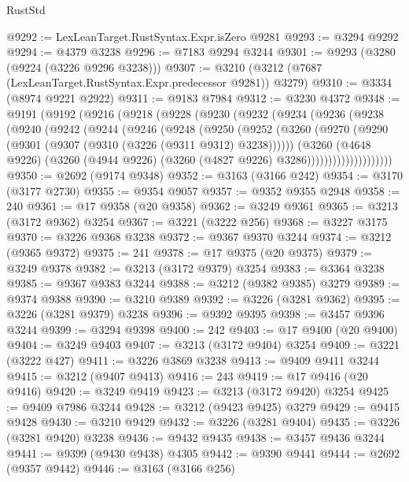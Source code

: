 \begin{lexlean}{RustStd}
\begin{coremodule}
@9292 := LexLeanTarget.RustSyntax.Expr.isZero @9281
@9293 := @3294 @9292
@9294 := @4379 @3238
@9296 := @7183 @9294 @3244
@9301 := @9293 (@3280 (@9224 (@3226 @9296 @3238)))
@9307 := @3210 (@3212 (@7687 (LexLeanTarget.RustSyntax.Expr.predecessor @9281)) @3279)
@9310 := @3334 (@8974 @9221 @2922)
@9311 := @9183 @7984
@9312 := @3230 @4372
@9348 := @9191
    (@9192
      (@9216
        (@9218
          (@9228
            (@9230
              (@9232
                (@9234
                  (@9236
                    (@9238
                      (@9240
                        (@9242
                          (@9244
                            (@9246
                              (@9248
                                (@9250
                                  (@9252
                                    (@3260
                                      (@9270
                                        (@9290 (@9301 (@9307 (@9310 (@3226 (@9311 @9312) @3238))))))
                                      (@3260
                                        (@4648 @9226)
                                        (@3260
                                          (@4944 @9226)
                                          (@3260 (@4827 @9226) @3286))))))))))))))))))))
@9350 := @2692 (@9174 @9348)
@9352 := @3163 (@3166 @242)
@9354 := @3170 (@3177 @2730)
@9355 := @9354 @9057
@9357 := @9352 @9355 @2948
@9358 := 240
@9361 := @17 @9358 (@20 @9358)
@9362 := @3249 @9361
@9365 := @3213 (@3172 @9362) @3254
@9367 := @3221 (@3222 @256)
@9368 := @3227 @3175
@9370 := @3226 @9368 @3238
@9372 := @9367 @9370 @3244
@9374 := @3212 (@9365 @9372)
@9375 := 241
@9378 := @17 @9375 (@20 @9375)
@9379 := @3249 @9378
@9382 := @3213 (@3172 @9379) @3254
@9383 := @3364 @3238
@9385 := @9367 @9383 @3244
@9388 := @3212 (@9382 @9385) @3279
@9389 := @9374 @9388
@9390 := @3210 @9389
@9392 := @3226 (@3281 @9362)
@9395 := @3226 (@3281 @9379) @3238
@9396 := @9392 @9395
@9398 := @3457 @9396 @3244
@9399 := @3294 @9398
@9400 := 242
@9403 := @17 @9400 (@20 @9400)
@9404 := @3249 @9403
@9407 := @3213 (@3172 @9404) @3254
@9409 := @3221 (@3222 @427)
@9411 := @3226 @3869 @3238
@9413 := @9409 @9411 @3244
@9415 := @3212 (@9407 @9413)
@9416 := 243
@9419 := @17 @9416 (@20 @9416)
@9420 := @3249 @9419
@9423 := @3213 (@3172 @9420) @3254
@9425 := @9409 @7986 @3244
@9428 := @3212 (@9423 @9425) @3279
@9429 := @9415 @9428
@9430 := @3210 @9429
@9432 := @3226 (@3281 @9404)
@9435 := @3226 (@3281 @9420) @3238
@9436 := @9432 @9435
@9438 := @3457 @9436 @3244
@9441 := @9399 (@9430 @9438) @4305
@9442 := @9390 @9441
@9444 := @2692 (@9357 @9442)
@9446 := @3163 (@3166 @256)

\end{coremodule}
\end{lexlean}
